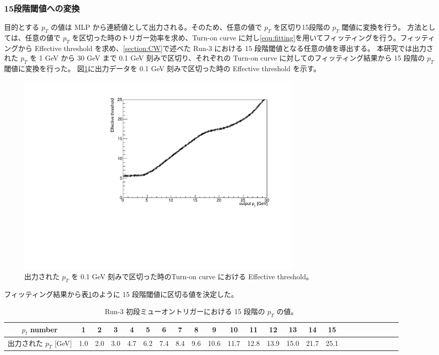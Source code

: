 \subsubsection{15段階閾値への変換}
目的とする $p_T$ の値は MLP から連続値として出力される。そのため、任意の値で $p_T$ を区切り15段階の $p_T$ 閾値に変換を行う。
方法としては、任意の値で $p_T$ を区切った時のトリガー効率を求め、Turn-on curve に対し\eqref{equ:fitting}を用いてフィッティングを行う。フィッティングから Effective threshold を求め、\ref{section:CW}で述べた Run-3 における 15 段階閾値となる任意の値を導出する。
本研究では出力された $p_T$ を 1 GeV から 30 GeV まで 0.1 GeV 刻みで区切り、それぞれの Turn-on curve に対してのフィッティング結果から 15 段階の $p_T$ 閾値に変換を行った。
図\ref{fig:Effictive_thr_v1}に出力データを 0.1 GeV 刻みで区切った時の Effective threshold を示す。
\begin{figure}[tb]
  \centering
  \includegraphics[clip, width=14cm]{fig/4/Effictive_thr_v1.pdf}
  \caption{出力された $p_T$ を 0.1 GeV 刻みで区切った時のTurn-on curve における Effective threshold。}
  \label{fig:Effictive_thr_v1}
\end{figure}
フィッティング結果から表\ref{Effective_number}のように 15 段階閾値に区切る値を決定した。
\begin{table}[thb]
\centering
    \caption{Run-3 初段ミューオントリガーにおける 15 段階の $p_T$ の値。}
    \label{Effective_number}
    
    \begin{tabular}{|c|c|c|c|c|c|c|c|c|c|c|c|c|c|c|c|c|c|c|c|c|c|c|c|}
        \hline
        $p_t$ number & 1 & 2 & 3 & 4 & 5 & 6 & 7 & 8 & 9 & 10 & 11 & 12 & 13 & 14 & 15\\
        \hline
        出力された $p_T$ [GeV] & 1.0 & 2.0 & 3.0 & 4.7 & 6.2 & 7.4 & 8.4 & 9.6 & 10.6 & 11.7 & 12.8 & 13.9 & 15.0 & 21.7 & 25.1\\
        \hline
    \end{tabular}
\end{table}






